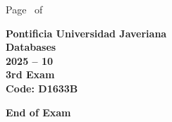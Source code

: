 \documentclass[11pt, addpoints]{exam}\usepackage[utf8]{inputenc}
\begin{document}
\begin{coverpages}
\begin{center}
			\vspace{3mm}
			\leavevmode \hspace{5mm} 
		\end{center}
	\end{coverpages}

	\footer{} {Page \thepage\ of \numpages} {}

	\centering
	\textbf{\Large Pontificia Universidad Javeriana}\\
	\textbf{\Large Databases} \\
	\textbf{\large 2025 -- 10} \\
	\textbf{\large 3rd Exam} \\
	\textbf{Code: D1633B}


	\begin{questions}
		
		
		
		
		
		
		
		
		
		
		
		
		
		
		
		
		
		
		
		
	\end{questions}

	\vspace{5mm}
	\noindent \textbf{End of Exam}
\end{document}
